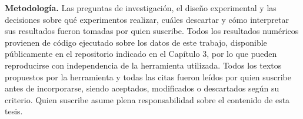 \documentclass{umemoria}
\begin{document}
\textbf{Metodología.} Las preguntas de investigación, el diseño experimental y las decisiones sobre qué experimentos realizar, cuáles descartar y cómo interpretar sus resultados fueron tomadas por quien suscribe. Todos los resultados numéricos provienen de código ejecutado sobre los datos de este trabajo, disponible públicamente en el repositorio indicado en el Capítulo 3, por lo que pueden reproducirse con independencia de la herramienta utilizada. Todos los textos propuestos por la herramienta y todas las citas fueron leídos por quien suscribe antes de incorporarse, siendo aceptados, modificados o descartados según su criterio. Quien suscribe asume plena responsabilidad sobre el contenido de esta tesis.

\tableofcontents

\mainmatter








\nocite{*}


\end{document}
